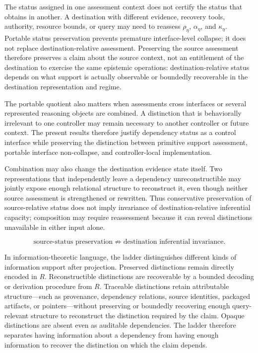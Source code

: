 \documentclass[11pt]{article}
\theoremstyle{definition}
\theoremstyle{remark}
\begin{document}
The status assigned in one assessment context does not certify the status that obtains in another. A destination with different evidence, recovery tools, authority, resource bounds, or query may need to reassess \(\rho_{\eta}\), \(\alpha_{\eta}\), and \(\kappa_{\eta}\). Portable status preservation prevents premature interface-level collapse; it does not replace destination-relative assessment. Preserving the source assessment therefore preserves a claim about the source context, not an entitlement of the destination to exercise the same epistemic operations: destination-relative status depends on what support is actually observable or boundedly recoverable in the destination representation and regime.

The portable quotient also matters when assessments cross interfaces or several represented reasoning objects are combined. A distinction that is behaviorally irrelevant to one controller may remain necessary to another controller or future context. The present results therefore justify dependency status as a control interface while preserving the distinction between primitive support assessment, portable interface non-collapse, and controller-local implementation.

Combination may also change the destination evidence state itself. Two representations that independently leave a dependency unreconstructible may jointly expose enough relational structure to reconstruct it, even though neither source assessment is strengthened or rewritten. Thus conservative preservation of source-relative status does not imply invariance of destination-relative inferential capacity; composition may require reassessment because it can reveal distinctions unavailable in either input alone.

\[
\boxed{
\text{source-status preservation}
\not\Rightarrow
\text{destination inferential invariance}.
}
\]

In information-theoretic language, the ladder distinguishes different kinds of information support after projection. Preserved distinctions remain directly encoded in $R$. Reconstructible distinctions are recoverable by a bounded decoding or derivation procedure from $R$. Traceable distinctions retain attributable structure---such as provenance, dependency relations, source identities, packaged artifacts, or pointers---without preserving or boundedly recovering enough query-relevant structure to reconstruct the distinction required by the claim. Opaque distinctions are absent even as auditable dependencies. The ladder therefore separates having information about a dependency from having enough information to recover the distinction on which the claim depends.
\end{document}
